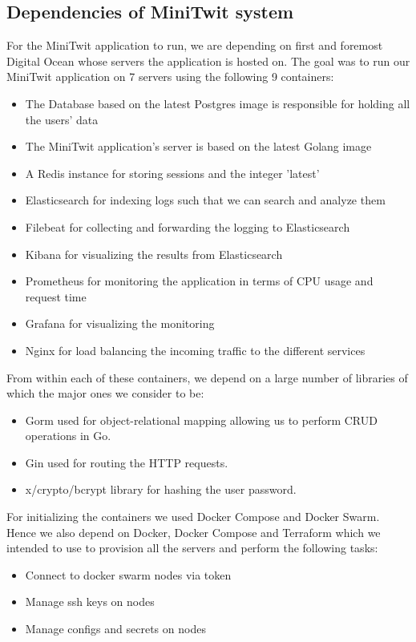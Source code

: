 \subsection{Dependencies of MiniTwit system}
For the MiniTwit application to run, we are depending on first and foremost Digital Ocean whose servers the application is 
hosted on. The goal was to run our MiniTwit application on 7 servers using the following 9 containers: 
\begin{itemize}
    \item The Database based on the latest Postgres image is responsible for holding all the users' data
    \item The MiniTwit application's server is based on the latest Golang image
    \item A Redis instance for storing sessions and the integer 'latest'
    \item Elasticsearch for indexing logs such that we can search and analyze them
    \item Filebeat for collecting and forwarding the logging to Elasticsearch
    \item Kibana for visualizing the results from Elasticsearch
    \item Prometheus for monitoring the application in terms of CPU usage and request time
    \item Grafana for visualizing the monitoring
    \item Nginx for load balancing the incoming traffic to the different services
\end{itemize}

From within each of these containers, we depend on a large number of libraries of which the major ones we consider to be:
\begin{itemize}
    \item Gorm used for object-relational mapping allowing us to perform CRUD operations in Go.
    \item Gin used for routing the HTTP requests.
    \item x/crypto/bcrypt library for hashing the user password.
\end{itemize}

For initializing the containers we used Docker Compose and Docker Swarm. Hence we also depend on Docker, Docker Compose
and Terraform which we intended to use to provision all the servers and perform the following tasks:
\begin{itemize}
    \item Connect to docker swarm nodes via token
    \item Manage ssh keys on nodes 
    \item Manage configs and secrets on nodes
\end{itemize}

